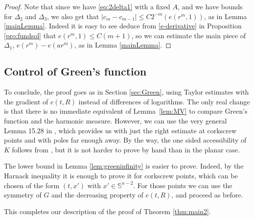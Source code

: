 \documentclass[JEP,XML,SOM,Unicode,published]{cedram}
\numberwithin{equation}{section}
\theoremstyle{plain}
\theoremstyle{definition}
\begin{document}
\begin{proof}
Note that since we have \eqref{eq:2delta1} with a fixed $A$, and we have bounds for $\Delta_2$ and $\Delta_3$,
we also get that $|c_m-c_{m-1}| \leq C 2^{-m} (e(r^m,1))$, as in Lemma \ref{mainLemma}. Indeed it is easy to see deduce
from \ref{e-derivative} in Proposition \ref{pro:fundsol} that $e(r^m,1) \leq C (m+1)$, so we can estimate the main piece of
$\Delta_1$, \ie $e(r^m)-e(ar^m)$, as in Lemma \ref{mainLemma}.
\end{proof}

\subsection{Control of Green's function}

To conclude, the proof goes as in Section \ref{sec:Green}, using Taylor estimates with the gradient of $e(t,R)$ instead of differences of logarithms. The only real change is that there is no immediate equivalent of Lemma~\ref{lem:MV} to compare Green's function and the harmonic measure.
However, we can use the very general Lemma 15.28 in \cite{DFM-Mixed}, which provides us with just the right estimate at corkscrew points and with poles far enough away. By the way, the one sided accessibility of $K$ follows from \cite[Lem.\,2.2]{DFM-Memoirs}, but it is not harder to prove by hand than in the planar case.

The lower bound in Lemma \ref{lem:greeninfinity} is easier to prove. Indeed, by the Harnack inequality it is enough to
prove it for corkscrew points, which can be chosen of the form $(t,x')$ with $x' \in \mathbb{S}^{n-2}$.
For those points we can use the symmetry of $G$ and the decreasing property of $e(t,R)$, and proceed as before.

This completes our description of the proof of Theorem \ref{thm:main2}.




\end{document}

